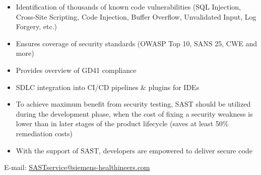 \begin{itemize}
	\item	Identification of thousands of known code vulnerabilities (SQL Injection, Cross-Site Scripting, Code Injection, Buffer Overflow, Unvalidated Input, Log Forgery, etc.)
	\item	Ensures coverage of security standards (OWASP Top 10, SANS 25, CWE and more)
	\item	Provides overview of GD41 compliance 
	\item	SDLC integration into CI/CD pipelines \& plugins for IDEs
	\item	To achieve maximum benefit from security testing, SAST should be utilized during the development phase, when the cost of fixing a security weakness is lower than in later stages of the product lifecycle (saves at least 50\% remediation costs) 
	\item	With the support of SAST, developers are empowered to deliver secure code
\end{itemize}


E-mail: \href{mailto:SASTservice@siemens-healthineers.com}{SASTservice@siemens-healthineers.com}

